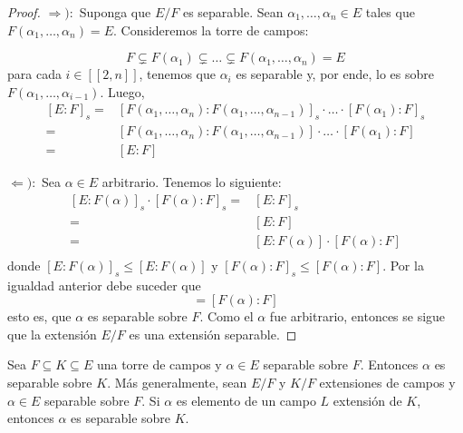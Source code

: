 \documentclass[12pt]{report}
\theoremstyle{largebreak}
\newcommand\natint[1]{\ensuremath{\left[\!\left[ #1\right]\!\right]}}
\begin{document}
    \begin{proof}
        $\Rightarrow):$ Suponga que $E/F$ es separable. Sean $\alpha_1,\dots,\alpha_n\in E$ tales que $F(\alpha_1,\dots,\alpha_n)=E$. Consideremos la torre de campos:
        
        \begin{equation*}
            F\subsetneq F(\alpha_1)\subsetneq\dots\subsetneq F(\alpha_1,\dots,\alpha_n)=E
        \end{equation*}
        para cada $i\in\natint{2,n}$, tenemos que $\alpha_i$ es separable y, por ende, lo es sobre $F(\alpha_1,\dots,\alpha_{i-1})$. Luego,
        \begin{equation*}
            \begin{split}
                [E:F]_s=&[F(\alpha_1,\dots,\alpha_n):F(\alpha_1,\dots,\alpha_{n-1})]_s\cdot\dots\cdot[F(\alpha_1):F]_s\\
                =&[F(\alpha_1,\dots,\alpha_n):F(\alpha_1,\dots,\alpha_{n-1})]\cdot\dots\cdot[F(\alpha_1):F]\\
                =&[E:F]
            \end{split}
        \end{equation*}

        $\Leftarrow):$ Sea $\alpha\in E$ arbitrario. Tenemos lo siguiente:
        \begin{equation*}
            \begin{split}
                [E:F(\alpha)]_s\cdot[F(\alpha):F]_s=&[E:F]_s\\
                =&[E:F]\\
                =&[E:F(\alpha)]\cdot[F(\alpha):F]\\
            \end{split}
        \end{equation*}
        donde $[E:F(\alpha)]_s\leq [E:F(\alpha)]$ y $[F(\alpha):F]_s\leq [F(\alpha):F]$. Por la igualdad anterior debe suceder que
        \begin{equation*}
            [F(\alpha):F]=[F(\alpha):F]
        \end{equation*}
        esto es, que $\alpha$ es separable sobre $F$. Como el $\alpha$ fue arbitrario, entonces se sigue que la extensión $E/F$ es una extensión separable.

    \end{proof}

    \begin{obs}
        Sea $F\subseteq K \subseteq E$ una torre de campos y $\alpha\in E$ separable sobre $F$. Entonces $\alpha$ es separable sobre $K$. Más generalmente, sean $E/F$ y $K/F$ extensiones de campos y $\alpha\in E$ separable sobre $F$. Si $\alpha$ es elemento de un campo $L$ extensión de $K$, entonces $\alpha$ es separable sobre $K$.
    \end{obs}
\end{document}
